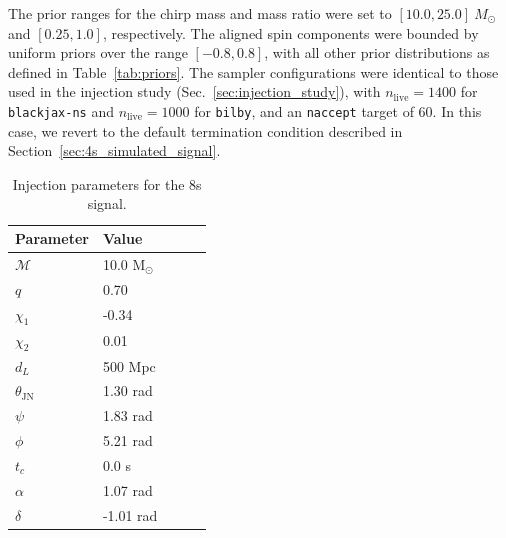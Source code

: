 \documentclass[fleqn,usenatbib]{mnras}
\begin{document}
The prior ranges for the chirp mass and mass ratio were set to
$[10.0, 25.0]~M_{\odot}$ and $[0.25, 1.0]$, respectively. The aligned
spin components were bounded by uniform priors over the range
$[-0.8, 0.8]$, with all other prior distributions as defined in
Table~\ref{tab:priors}. The sampler configurations were identical to
those used in the injection study (Sec.~\ref{sec:injection_study}), with
$n_{\text{live}}=1400$ for \texttt{blackjax-ns} and
$n_{\text{live}}=1000$ for \texttt{bilby}, and an \texttt{naccept}
target of 60. In this case, we revert to the 
default termination condition described in Section~\ref{sec:4s_simulated_signal}.

\begin{table}
    \centering
    \caption{Injection parameters for the 8s signal.}
    \label{tab:8s_injection_params}
    \begin{tabular}{l l l c c}
    \hline
    \hline
    \textbf{Parameter} & \textbf{Value} \\
    \hline
    $\mathcal{M}$ & 10.0 M$_{\odot}$ \\
    $q$ & 0.70 \\
    $\chi_1$ & -0.34 \\
    $\chi_2$ & 0.01 \\
    $d_L$ & 500 Mpc \\
    $\theta_{\textrm{JN}}$ & 1.30 rad \\
    $\psi$ & 1.83 rad \\
    $\phi$ & 5.21 rad \\
    $t_c$ & 0.0 s\\
    $\alpha$ & 1.07 rad \\
    $\delta$ & -1.01 rad \\
    \hline
    \hline
    \end{tabular}
    \end{table}
\end{document}
